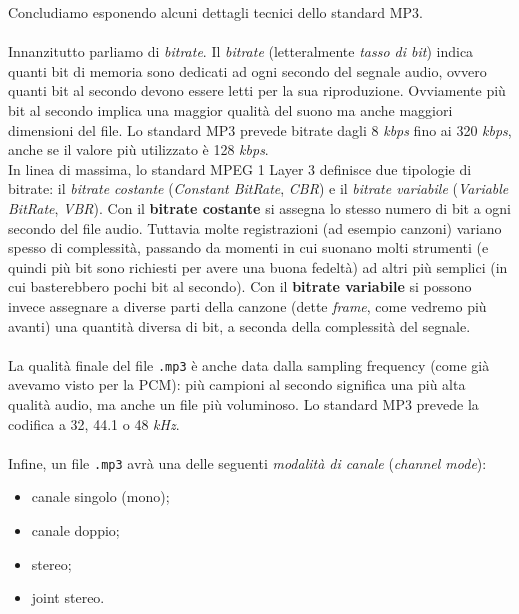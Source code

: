 			Concludiamo esponendo alcuni dettagli tecnici dello standard MP3.\\
			\\
			Innanzitutto parliamo di \textit{bitrate}. Il \textit{bitrate} (letteralmente \textit{tasso di bit}) indica quanti bit di memoria sono dedicati ad ogni secondo del segnale audio, ovvero quanti bit al secondo devono essere letti per la sua riproduzione. Ovviamente più bit al secondo implica una maggior qualità del suono ma anche maggiori dimensioni del file. Lo standard MP3 prevede bitrate dagli 8 \textit{kbps} fino ai 320 \textit{kbps}, anche se il valore più utilizzato è 128 \textit{kbps}.\\
			In linea di massima, lo standard MPEG 1 Layer 3 definisce due tipologie di bitrate: il \textit{bitrate costante} (\textit{Constant BitRate}, \textit{CBR}) e il \textit{bitrate variabile} (\textit{Variable BitRate}, \textit{VBR}). Con il \textbf{bitrate costante} si assegna lo stesso numero di bit a ogni secondo del file audio. Tuttavia molte registrazioni (ad esempio canzoni) variano spesso di complessità, passando da momenti in cui suonano molti strumenti (e quindi più bit sono richiesti per avere una buona fedeltà) ad altri più semplici (in cui basterebbero pochi bit al secondo). Con il \textbf{bitrate variabile} si possono invece assegnare a diverse parti della canzone (dette \textit{frame}, come vedremo più avanti) una quantità diversa di bit, a seconda della complessità del segnale.\\
			\\
			La qualità finale del file \texttt{.mp3} è anche data dalla sampling frequency (come già avevamo visto per la PCM): più campioni al secondo significa una più alta qualità audio, ma anche un file più voluminoso. Lo standard MP3 prevede la codifica a 32, 44.1 o 48 \textit{kHz}.\\
			\\
			Infine, un file \texttt{.mp3} avrà una delle seguenti \textit{modalità di canale} (\textit{channel mode}):
			\begin{itemize}
				\item canale singolo (mono);
				\item canale doppio;
				\item stereo;
				\item joint stereo.
			\end{itemize}
